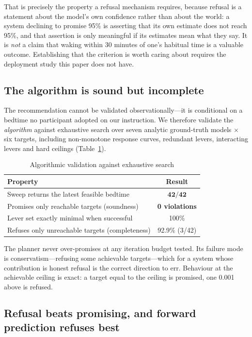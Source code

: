 \documentclass[conference]{IEEEtran}
\begin{document}
That is precisely the property a refusal mechanism requires, because refusal is
a statement about the model's own confidence rather than about the world: a
system declining to promise 95\% is asserting that its own estimate does not
reach 95\%, and that assertion is only meaningful if its estimates mean what
they say. It is \emph{not} a claim that waking within 30 minutes of one's
habitual time is a valuable outcome. Establishing that the criterion is worth
caring about requires the deployment study this paper does not have.

\subsection{The algorithm is sound but incomplete}
\label{sec:sound}

The recommendation cannot be validated observationally---it is conditional on a
bedtime no participant adopted on our instruction. We therefore validate the
\emph{algorithm} against exhaustive search over seven analytic ground-truth
models $\times$ six targets, including non-monotone response curves, redundant
levers, interacting levers and hard ceilings (Table~\ref{tab:sound}).

\begin{table}[t]
\caption{Algorithmic validation against exhaustive search}
\label{tab:sound}
\centering
\small
\begin{tabular}{lc}
\toprule
Property & Result \\
\midrule
Sweep returns the latest feasible bedtime & $\mathbf{42/42}$ \\
Promises only reachable targets (soundness) & \textbf{0 violations} \\
Lever set exactly minimal when successful & 100\% \\
Refuses only unreachable targets (completeness) & 92.9\% (3/42) \\
\bottomrule
\end{tabular}
\end{table}

The planner never over-promises at any iteration budget tested. Its failure mode
is conservatism---refusing some achievable targets---which for a system whose
contribution is honest refusal is the correct direction to err. Behaviour at the
achievable ceiling is exact: a target equal to the ceiling is promised, one
0.001 above is refused.

\subsection{Refusal beats promising, and forward prediction refuses best}
\label{sec:refusal}
\end{document}
